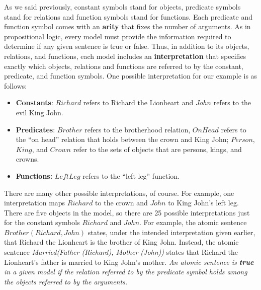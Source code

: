 \newline\newline
As we said previously, constant symbols stand for objects, predicate symbols stand for relations and function symbols stand for functions. Each
predicate and function symbol comes with an \textbf{arity} that fixes the number of arguments. As in propositional logic, every model must provide the information required to determine if any given sentence is true or false. Thus, in addition to its objects, relations, and functions, each model includes an \textbf{interpretation} that specifies exactly which objects, relations and functions are referred to by the constant, predicate, and function symbols. One
possible interpretation for our example is as follows:
\begin{itemize}
    
    
    \item \textbf{Constants}: $Richard$ refers to Richard the Lionheart and $John$ refers to the evil King John.

    \item \textbf{Predicates}: $Brother$ refers to the brotherhood relation, $OnHead$ refers to the “on head” relation that holds between the crown and King John; $Person$, $King$, and $Crown$ refer to the sets of objects that are persons, kings, and crowns.

    \item \textbf{Functions:} $LeftLeg$ refers to the “left leg” function.

\end{itemize}
There are many other possible interpretations, of course. For example, one interpretation maps $Richard$ to the crown and $John$ to King John’s left leg. There are five objects in the model, so there are 25 possible interpretations just for the constant symbols $Richard$ and $John$.\newline\newline
For example, the atomic sentence $Brother(Richard, John)$ states, under the intended interpretation given earlier, that Richard the Lionheart is the
brother of King John. Instead, the atomic sentence \textit{Married(Father (Richard), Mother (John))} states that Richard the Lionheart’s father is married to King John’s mother.\newline\newline
\textit{An atomic sentence is \textbf{true} in a given model if the relation referred to by the predicate symbol holds among the objects referred to by the arguments.}\newline\newline
